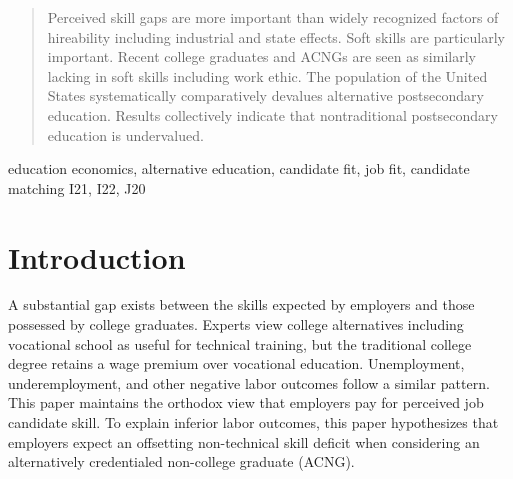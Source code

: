 \documentclass[review]{elsarticle}
\begin{document}
\begin{frontmatter}
\begin{abstract}
        Perceived skill gaps are more important than widely recognized factors of hireability including industrial and state effects.
        Soft skills are particularly important.
        Recent college graduates and ACNGs are seen as similarly lacking in soft skills including work ethic.
        The population of the United States systematically comparatively devalues alternative postsecondary education.
        Results collectively indicate that nontraditional postsecondary education is undervalued.
    \end{abstract}

    \begin{keyword}
        education economics, alternative education, candidate fit, job fit, candidate matching     %
        \MSC[2010] I21, I22, J20                                                                   %
    \end{keyword}

\end{frontmatter}

\pagebreak
\linenumbers

\section{Introduction}

A substantial gap exists between the skills expected by employers and those possessed by college graduates\cite{mcgarry2016examination, malik2017great, abbasi2018analysis, gingras2000there}.
Experts view college alternatives including vocational school as useful for technical training, but the traditional college degree retains a wage premium over vocational education.
Unemployment, underemployment, and other negative labor outcomes follow a similar pattern\cite{smith_2011}.
This paper maintains the orthodox view that employers pay for perceived job candidate skill.
To explain inferior labor outcomes,
this paper hypothesizes that employers expect an offsetting non-technical skill deficit when considering an alternatively credentialed non-college graduate (ACNG).

\end{document}
